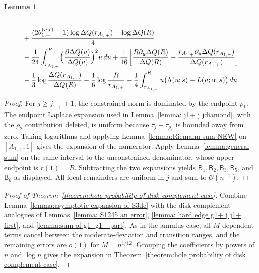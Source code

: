 \documentclass[a4paper]{article}
\newtheorem{lemma}[theorem]{Lemma}
\numberwithin{equation}{section}
\begin{document}
\begin{lemma}
\begin{align*}
\\
&\quad
+\frac{(2\theta_{1,+}^{(n,\epsilon)}-1)\log\Delta Q(r_{A_{1,+}})-\log\Delta Q(R)}{4}
\\
&\quad
-\frac{1}{24}\int_{r_{A_{1,+}}}^{R}\Bigl(\frac{\partial \Delta Q(u)}{\Delta Q(u)}\Bigr)^2u\,du
+\frac{1}{16}\bigg[
\frac{R\partial_u\Delta Q(R)}{\Delta Q(R)}-\frac{r_{A_{1,+}}\partial_u\Delta Q(r_{A_{1,+}})}{\Delta Q(r_{A_{1,+}})}
\bigg]\\
&\quad 
-\frac{1}{3}\log\frac{\Delta Q(r_{A_{1,+}})}{\Delta Q(R)}
-\frac{1}{6}\log\frac{R}{r_{A_{1,+}}}
-\frac{1}{4}\int_{r_{A_{1,+}}}^{R}u\bigl( \Lambda(u;s)+L(u;\alpha,s)\bigr)\,du.
\end{align*}
\end{lemma}

\begin{proof}
For $j\geq j_{1,+}+1$, the constrained norm is dominated by the endpoint $\rho_1$. The endpoint Laplace expansion used in Lemma~\ref{lemma: j1+ j jdiamond}, with the $\rho_2$ contribution deleted, is uniform because $\tau_j-\tau_{\rho_1}$ is bounded away from zero. Taking logarithms and applying Lemma~\ref{lemma:Riemann sum NEW} on $[A_{1,+},1]$ gives the expansion of the numerator. Apply Lemma~\ref{lemma:general sum} on the same interval to the unconstrained denominator, whose upper endpoint is $r(1)=R$. Subtracting the two expansions yields $\mathsf B_1,\mathsf B_2,\mathsf B_3,\mathsf B_5$, and $\mathsf B_6$ as displayed. All local remainders are uniform in $j$ and sum to $\mathcal O(n^{-1})$.
\end{proof}

\begin{proof}[Proof of Theorem~\ref{theorem:hole probability of disk complement case}]
Combine Lemma~\ref{lemma:asymptotic expansion of S3dc} with the disk-complement analogues of Lemmas~\ref{lemma: S1245 an error}, \ref{lemma: hard edge g1+ j j1+ first}, and \ref{lemma:sum of g1- g1+ part}. As in the annulus case, all $M$-dependent terms cancel between the moderate-deviation and transition ranges, and the remaining errors are $o(1)$ for $M=n^{1/12}$. Grouping the coefficients by powers of $n$ and $\log n$ gives the expansion in Theorem~\ref{theorem:hole probability of disk complement case}.
\end{proof}
\end{document}
